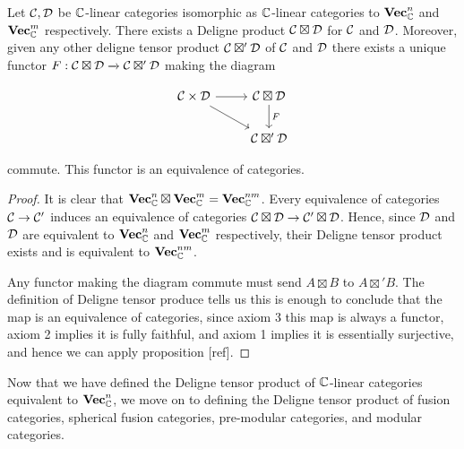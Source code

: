 \begin{prop} Let ${\mathcal C},{\mathcal D}$ be ${\mathbb C}$-linear categories isomorphic as ${\mathbb C}$-linear categories to ${\bf Vec}_{{\mathbb C}}^n$ and ${\bf Vec}_{{\mathbb C}}^m$ respectively. There exists a Deligne product ${\mathcal C}\boxtimes {\mathcal D}$ for ${\mathcal C}$ and ${\mathcal D}$. Moreover, given any other deligne tensor product ${\mathcal C}\boxtimes' {\mathcal D}$ of ${\mathcal C}$ and ${\mathcal D}$ there exists a unique functor $F: {\mathcal C}\boxtimes {\mathcal D}\xrightarrow{} {\mathcal C}\boxtimes' {\mathcal D}$ making the diagram

\[\begin{tikzcd}
	{\cC\times\cD} & {\cC\boxtimes \cD} \\
	& {\cC\boxtimes' \cD}
	\arrow[from=1-1, to=1-2]
	\arrow[from=1-1, to=2-2]
	\arrow["F", from=1-2, to=2-2]
\end{tikzcd}\]

commute. This functor is an equivalence of categories.
\end{prop}
\begin{proof} It is clear that ${\bf Vec}_{{\mathbb C}}^n\boxtimes {\bf Vec}_{{\mathbb C}}^m = {\bf Vec}_{{\mathbb C}}^{nm}$. Every equivalence of categories ${\mathcal C} \to {\mathcal C}'$ induces an equivalence of categories ${\mathcal C}\boxtimes {\mathcal D}\to{\mathcal C}'\boxtimes {\mathcal D}$. Hence, since ${\mathcal D}$ and ${\mathcal D}$ are equivalent to ${\bf Vec}_{{\mathbb C}}^n$ and ${\bf Vec}_{{\mathbb C}}^m$ respectively, their Deligne tensor product exists and is equivalent to ${\bf Vec}_{{\mathbb C}}^{nm}$.

Any functor making the diagram commute must send $A\boxtimes B$ to $A\boxtimes' B$. The definition of Deligne tensor produce tells us this is enough to conclude that the map is an equivalence of categories, since axiom 3 this map is always a functor, axiom 2 implies it is fully faithful, and axiom 1 implies it is essentially surjective, and hence we can apply proposition [ref].
\end{proof}

Now that we have defined the Deligne tensor product of ${\mathbb C}$-linear categories equivalent to ${\bf Vec}_{{\mathbb C}}^n$, we move on to defining the Deligne tensor product of fusion categories, spherical fusion categories, pre-modular categories, and modular categories.

